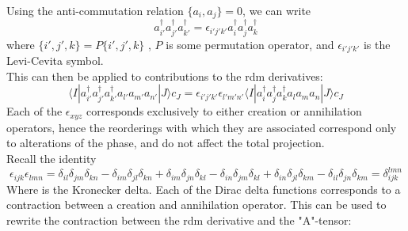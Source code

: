 \documentclass[12pt]{article}
\begin{document}
Using the anti-commutation relation $\{a_{i}, a_{j}\} = 0$, we can write 
\begin{equation}
a^{\dagger}_{i'}  a^{\dagger}_{j'}a^{\dagger}_{k'} =  \epsilon_{i'j'k'} 
a^{\dagger}_{i}  a^{\dagger}_{j}a^{\dagger}_{k}    
\end{equation}
where $\{i',j',k\} = P \{i',j',k\}$ , $P$ is some permutation operator, and $\epsilon_{i'j'k'}$ is 
the Levi-Cevita symbol.\\

\noindent This can then be applied to contributions to the rdm derivatives:
\begin{equation}
\langle I | a^{\dagger}_{i'}  a^{\dagger}_{j'}a^{\dagger}_{k'}  a_{l'}  a_{m'}a_{n'}| J \rangle c_{J}  =  
\epsilon_{i'j'k'}
\epsilon_{l'm'n'}
\langle I | a^{\dagger}_{i}  a^{\dagger}_{j}a^{\dagger}_{k}  a_{l}  a_{m}a_{n}| J \rangle c_{J}   
\end{equation}
Each of the $\epsilon_{xyz}$ corresponds exclusively to either creation or annihilation operators, hence
the reorderings with which they are associated correspond only to alterations of the phase, and do not affect
the total projection. \\

\noindent Recall the identity
\begin{equation}
\epsilon_{ijk}\epsilon_{lmn}
=
 \delta_{il}\delta_{jm}\delta_{kn}
-\delta_{im}\delta_{jl}\delta_{kn}
+\delta_{im}\delta_{jn}\delta_{kl}
-\delta_{in}\delta_{jm}\delta_{kl}
+\delta_{in}\delta_{jl}\delta_{km}
-\delta_{il}\delta_{jn}\delta_{km}
= \delta_{ijk}^{lmn}
\end{equation}
Where is the Kronecker delta. Each of the Dirac delta functions corresponds
to a contraction between a creation and annihilation operator.
This can be used to rewrite the contraction between the rdm derivative and the "A"-tensor:
\end{document}
